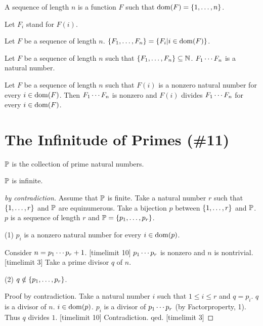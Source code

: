 \documentclass{article}
\begin{document}
\begin{forthel}

\begin{definition}
A sequence of length $n$ is a
function $F$ such that $\operatorname{dom}(F) = \{1,\dots,n\}$.
\end{definition}

Let $F_{i}$ stand for $F(i)$.

\begin{definition}
Let $F$ be a sequence of length $n$.
$\{F_{1},\dots,F_{n}\} = \{ F_{i} | i \in \operatorname{dom}(F)\}$.
\end{definition}





\begin{signature}
Let $F$ be a sequence of length $n$
such that $\{F_{1},\dots,F_{n}\} \subseteq \mathbb{N}$.
$F_{1} \cdots F_{n}$ is a natural number.
\end{signature}

\begin{axiom}[Factorproperty]
Let $F$ be a sequence of length $n$
such that $F(i)$ is a nonzero natural number for every $i \in \operatorname{dom}(F)$.
Then $F_{1} \cdots F_{n}$ is nonzero and
$F(i)$ divides $F_{1} \cdots F_{n}$ for every $i \in \operatorname{dom}(F)$.
\end{axiom}

\end{forthel}

\section{The Infinitude of Primes (\#11)}

\begin{forthel}

\begin{signature}
$\mathbb{P}$ is the collection of prime natural numbers.
\end{signature}

\begin{theorem}[Euclid]
$\mathbb{P}$ is infinite.
\end{theorem}
\begin{proof}[by contradiction]
Assume that $\mathbb{P}$ is finite.
Take a natural number $r$ such that $\{1,\dots,r\}$ and $\mathbb{P}$ are equinumerous.
Take a bijection $p$ between $\{1,\dots,r\}$ and $\mathbb{P}$.
$p$ is a sequence of length $r$ and 
$\mathbb{P} = \{p_{1},\dots,p_{r}\}$.

(1) $p_{i}$ is a nonzero natural number for every
$i \in  \operatorname{dom}(p)$.

Consider $n = p_{1} \cdots p_{r}+1$. [timelimit 10]
$p_{1} \cdots p_{r}$ is nonzero and $n$ is nontrivial. [timelimit 3]
Take a prime divisor $q$ of $n$.

(2) $q \notin \{p_{1},\dots,p_{r}\}$.

Proof by contradiction.
Take a natural number $i$ such that $1 \leq i \leq r$
and $q=p_{i}$.
$q$ is a divisor of $n$.
$i \in \operatorname{dom}(p)$. 
$p_{i}$ is a divisor of $p_{1} \cdots p_{r}$
(by Factorproperty, 1).
Thus $q$ divides $1$. [timelimit 10]
Contradiction. qed.
[timelimit 3]
\end{proof}
\end{forthel}
\end{document}
